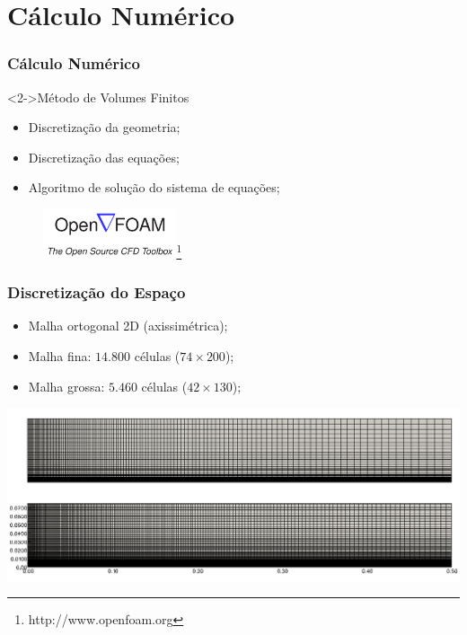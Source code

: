 \documentclass[bars,mathserif]{beamer}
\begin{document}
\section{Cálculo Numérico}
\frame{\tableofcontents[currentsection]}
%
\begin{frame}[fragile] %
\frametitle{Cálculo Numérico}
\begin{block}<2->{Método de Volumes Finitos}
\begin{itemize}
  \item<2-> Discretização da geometria;
  \item<2-> Discretização das equações;
  \item<2-> Algoritmo de solução do sistema de equações;
\end{itemize}
\end{block}

\begin{figure}\centering
\includegraphics[width=0.35\textwidth]{./imgs/foam_logo.png}\footnote<3->{http://www.openfoam.org}
\end{figure}

\end{frame}
%
\begin{frame}
\frametitle{Discretização do Espaço}
\begin{itemize}
  \item Malha ortogonal 2D (axissimétrica);
  \item Malha fina: $14.800$ células ($74 \times 200$);
  \item Malha grossa: $5.460$ células ($42 \times 130$);
\end{itemize}
\centering \includegraphics[width=\textwidth]{./imgs/grid.png}
\end{frame}
%
\end{document}

